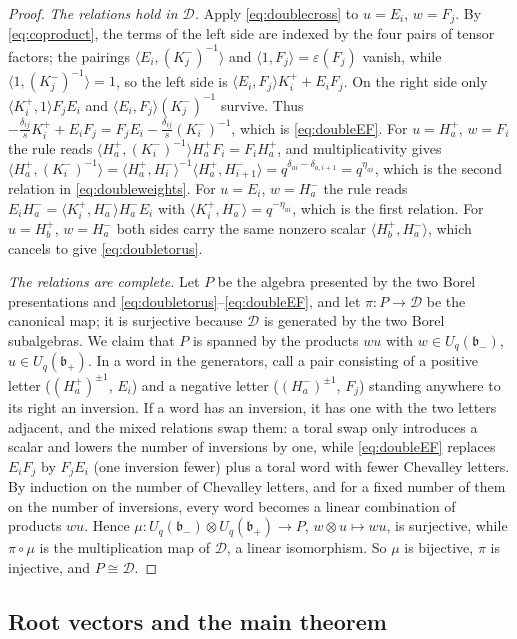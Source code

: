 \documentclass[12pt]{article}
\theoremstyle{remark}
\newcommand{\U}{U_q}
\newcommand{\bp}{\mathfrak b_+}
\newcommand{\bm}{\mathfrak b_-}
\newcommand{\ot}{\otimes}
\newcommand{\la}{\langle}
\newcommand{\ra}{\rangle}
\newcommand{\cD}{\mathcal D}
\begin{document}
\begin{proof}
\emph{The relations hold in $\cD$.} Apply \eqref{eq:doublecross} to
$u=E_i$, $w=F_j$. By \eqref{eq:coproduct}, the terms of the left side
are indexed by the four pairs of tensor factors; the pairings
$\la E_i,(K^-_j)^{-1}\ra$ and $\la1,F_j\ra=\varepsilon(F_j)$ vanish, while
$\la1,(K^-_j)^{-1}\ra=1$, so the left side is
$\la E_i,F_j\ra K^+_i+E_iF_j$. On the right side only
$\la K^+_i,1\ra F_jE_i$ and $\la E_i,F_j\ra(K^-_j)^{-1}$ survive.
Thus
$-\frac{\delta_{ij}}s K^+_i+E_iF_j=F_jE_i-\frac{\delta_{ij}}s(K^-_i)^{-1}$,
which is \eqref{eq:doubleEF}. For $u=H^+_a$, $w=F_i$ the rule reads
$\la H^+_a,(K^-_i)^{-1}\ra H^+_aF_i=F_iH^+_a$, and multiplicativity
gives
$\la H^+_a,(K^-_i)^{-1}\ra
 =\la H^+_a,H^-_i\ra^{-1}\la H^+_a,H^-_{i+1}\ra
 =q^{\delta_{ai}-\delta_{a,i+1}}=q^{\eta_{ai}}$,
which is the second relation in \eqref{eq:doubleweights}. For $u=E_i$,
$w=H^-_a$ the rule reads $E_iH^-_a=\la K^+_i,H^-_a\ra H^-_aE_i$ with
$\la K^+_i,H^-_a\ra=q^{-\eta_{ai}}$, which is the first relation. For
$u=H^+_b$, $w=H^-_a$ both sides carry the same nonzero scalar
$\la H^+_b,H^-_a\ra$, which cancels to give \eqref{eq:doubletorus}.

\emph{The relations are complete.} Let $P$ be the algebra presented by
the two Borel presentations and
\eqref{eq:doubletorus}--\eqref{eq:doubleEF}, and let $\pi:P\to\cD$ be
the canonical map; it is surjective because $\cD$ is generated by the
two Borel subalgebras. We claim that $P$ is spanned by the products
$wu$ with $w\in\U(\bm)$, $u\in\U(\bp)$. In a word in the generators,
call a pair consisting of a positive letter ($(H^+_a)^{\pm1}$, $E_i$)
and a negative letter ($(H^-_a)^{\pm1}$, $F_j$) standing anywhere to
its right an inversion. If a word has an inversion, it has one with the
two letters adjacent, and the mixed relations swap them: a toral swap
only introduces a scalar and lowers the number of inversions by one,
while \eqref{eq:doubleEF} replaces $E_iF_j$ by $F_jE_i$ (one inversion
fewer) plus a toral word with fewer Chevalley letters. By induction on
the number of Chevalley letters, and for a fixed number of them on the
number of inversions, every word becomes a linear combination of
products $wu$. Hence
$\mu:\U(\bm)\ot\U(\bp)\to P$, $w\ot u\mapsto wu$, is surjective, while
$\pi\circ\mu$ is the multiplication map of $\cD$, a linear isomorphism.
So $\mu$ is bijective, $\pi$ is injective, and $P\cong\cD$.
\end{proof}

\subsection{Root vectors and the main theorem}
\end{document}
